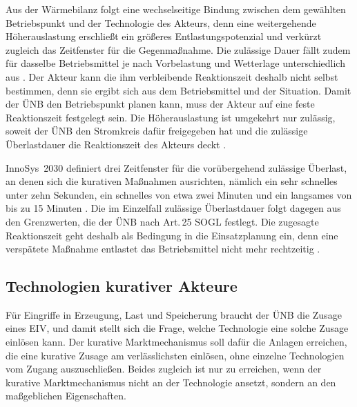 Aus der Wärmebilanz folgt eine wechselseitige Bindung zwischen dem gewählten Betriebspunkt und der Technologie des Akteurs, denn eine weitergehende Höherauslastung erschließt ein größeres Entlastungspotenzial und verkürzt zugleich das Zeitfenster für die Gegenmaßnahme.
Die zulässige Dauer fällt zudem für dasselbe Betriebsmittel je nach Vorbelastung und Wetterlage unterschiedlich aus \cite{sous_comparison_2025}.
Der Akteur kann die ihm verbleibende Reaktionszeit deshalb nicht selbst bestimmen, denn sie ergibt sich aus dem Betriebsmittel und der Situation.
Damit der \ac{ÜNB} den Betriebspunkt planen kann, muss der Akteur auf eine feste Reaktionszeit festgelegt sein.
Die Höherauslastung ist umgekehrt nur zulässig, soweit der \ac{ÜNB} den Stromkreis dafür freigegeben hat und die zulässige Überlastdauer die Reaktionszeit des Akteurs deckt \cite{uenb_grenzwertkonzept_2021}.

InnoSys~2030 definiert drei Zeitfenster für die vorübergehend zulässige Überlast, an denen sich die kurativen Maßnahmen ausrichten, nämlich ein sehr schnelles unter zehn Sekunden, ein schnelles von etwa zwei Minuten und ein langsames von bis zu 15 Minuten \cite{innosys_2030_gesamtverbund_innovationen_2021}.
Die im Einzelfall zulässige Überlastdauer folgt dagegen aus den Grenzwerten, die der \ac{ÜNB} nach Art.\,25 \ac{SOGL} festlegt.
Die zugesagte Reaktionszeit geht deshalb als Bedingung in die Einsatzplanung ein, denn eine verspätete Maßnahme entlastet das Betriebsmittel nicht mehr rechtzeitig \cite{lindner_operation_2023}.

\subsection{Technologien kurativer Akteure}
\label{sec:curative_actors}
\label{sec:curative_technologies}
\label{sec:actor_comparison}

Für Eingriffe in Erzeugung, Last und Speicherung braucht der \ac{ÜNB} die Zusage eines \ac{EIV}, und damit stellt sich die Frage, welche Technologie eine solche Zusage einlösen kann.
Der kurative Marktmechanismus soll dafür die Anlagen erreichen, die eine kurative Zusage am verlässlichsten einlösen, ohne einzelne Technologien vom Zugang auszuschließen.
Beides zugleich ist nur zu erreichen, wenn der kurative Marktmechanismus nicht an der Technologie ansetzt, sondern an den maßgeblichen Eigenschaften.

